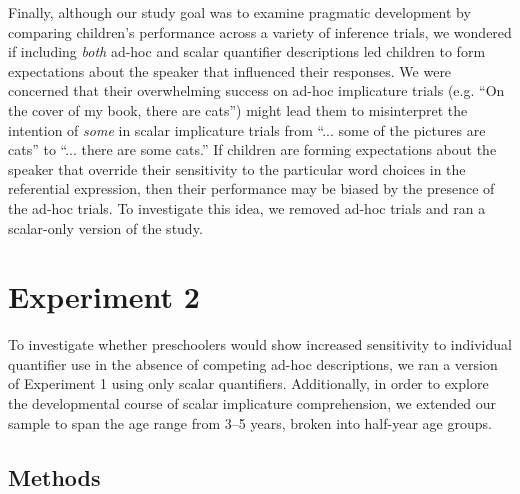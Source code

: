 \documentclass[10pt,letterpaper]{article}
\begin{document}

Finally, although our study goal was to examine pragmatic development by comparing children's performance across a variety of inference trials, we wondered if including \emph{both} ad-hoc and scalar quantifier descriptions led children to form expectations about the speaker that influenced their responses. We were concerned that their overwhelming success on ad-hoc implicature trials (e.g. ``On the cover of my book, there are cats'') might lead them to misinterpret the intention of \emph{some} in scalar implicature trials from ``... some of the pictures are cats'' to ``... there are some cats.'' If children are forming expectations about the speaker that override their sensitivity to the particular word choices in the referential expression, then their performance may be biased by the presence of the ad-hoc trials.  To investigate this idea, we removed ad-hoc trials and ran a scalar-only version of the study.

\section{Experiment 2} 


To investigate whether preschoolers would show increased sensitivity to individual quantifier use in the absence of competing ad-hoc descriptions, we ran a version of Experiment 1 using only scalar quantifiers. Additionally, in order to explore the developmental course of scalar implicature comprehension, we extended our sample to span the age range from 3--5 years, broken into half-year age groups.

\subsection{Methods}
\end{document}
